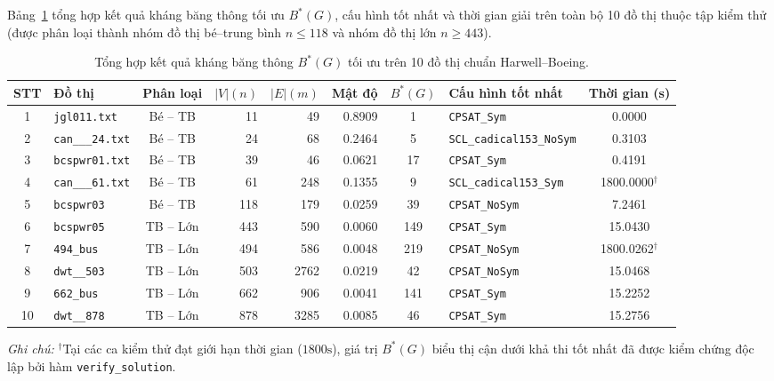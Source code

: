 \documentclass[a4paper,fleqn]{cas-sc}
\begin{document}
Bảng~\ref{tab:benchmark_10_summary} tổng hợp kết quả kháng băng thông tối ưu $B^*(G)$, cấu hình tốt nhất và thời gian giải trên toàn bộ 10 đồ thị thuộc tập kiểm thử (được phân loại thành nhóm đồ thị bé--trung bình $n \le 118$ và nhóm đồ thị lớn $n \ge 443$).

\begin{table}[pos=htbp]
\centering
\caption{Tổng hợp kết quả kháng băng thông $B^*(G)$ tối ưu trên 10 đồ thị chuẩn Harwell--Boeing.}
\label{tab:benchmark_10_summary}
\small
\begin{tabular}{clcrrrclc}
\toprule
\textbf{STT} & \textbf{Đồ thị} & \textbf{Phân loại} & \textbf{$|V| (n)$} & \textbf{$|E| (m)$} & \textbf{Mật độ} & \textbf{$B^*(G)$} & \textbf{Cấu hình tốt nhất} & \textbf{Thời gian (s)} \\
\midrule
1  & \texttt{jgl011.txt}     & Bé -- TB  & 11  & 49   & 0.8909 & 1   & \texttt{CPSAT\_Sym}             & 0.0000 \\
2  & \texttt{can\_\_\_24.txt} & Bé -- TB  & 24  & 68   & 0.2464 & 5   & \texttt{SCL\_cadical153\_NoSym} & 0.3103 \\
3  & \texttt{bcspwr01.txt}   & Bé -- TB  & 39  & 46   & 0.0621 & 17  & \texttt{CPSAT\_Sym}             & 0.4191 \\
4  & \texttt{can\_\_\_61.txt} & Bé -- TB  & 61  & 248  & 0.1355 & 9   & \texttt{SCL\_cadical153\_Sym}   & 1800.0000$^\dagger$ \\
5  & \texttt{bcspwr03}       & Bé -- TB  & 118 & 179  & 0.0259 & 39  & \texttt{CPSAT\_NoSym}           & 7.2461 \\
6  & \texttt{bcspwr05}       & TB -- Lớn & 443 & 590  & 0.0060 & 149 & \texttt{CPSAT\_Sym}             & 15.0430 \\
7  & \texttt{494\_bus}       & TB -- Lớn & 494 & 586  & 0.0048 & 219 & \texttt{CPSAT\_NoSym}           & 1800.0262$^\dagger$ \\
8  & \texttt{dwt\_\_503}     & TB -- Lớn & 503 & 2762 & 0.0219 & 42  & \texttt{CPSAT\_NoSym}           & 15.0468 \\
9  & \texttt{662\_bus}       & TB -- Lớn & 662 & 906  & 0.0041 & 141 & \texttt{CPSAT\_Sym}             & 15.2252 \\
10 & \texttt{dwt\_\_878}     & TB -- Lớn & 878 & 3285 & 0.0085 & 46  & \texttt{CPSAT\_Sym}             & 15.2756 \\
\bottomrule
\end{tabular}
\par\vspace{0.5ex}
\raggedright\textit{Ghi chú:} $^\dagger$Tại các ca kiểm thử đạt giới hạn thời gian ($1800\text{s}$), giá trị $B^*(G)$ biểu thị cận dưới khả thi tốt nhất đã được kiểm chứng độc lập bởi hàm \texttt{verify\_solution}.
\end{table}
\end{document}
